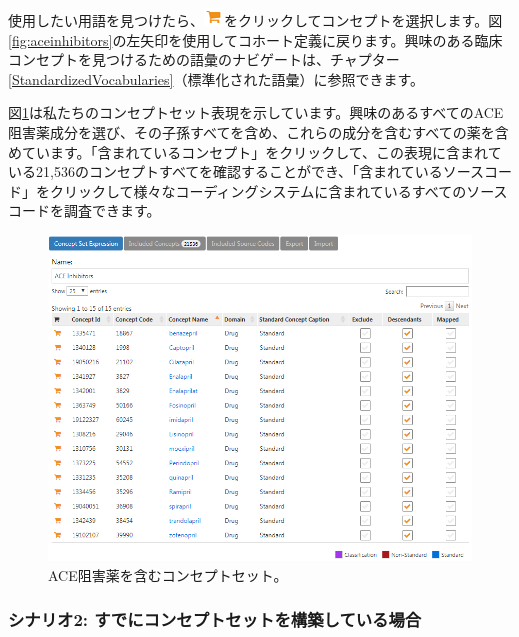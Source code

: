 \documentclass[
  11pt]{book}
\theoremstyle{definition}
\theoremstyle{definition}
\theoremstyle{definition}
\theoremstyle{definition}
\theoremstyle{remark}
\begin{document}
使用したい用語を見つけたら、\includegraphics{images/Cohorts/shoppingcart.png}をクリックしてコンセプトを選択します。図\ref{fig:aceinhibitors}の左矢印を使用してコホート定義に戻ります。興味のある臨床コンセプトを見つけるための語彙のナビゲートは、チャプター\ref{StandardizedVocabularies}（標準化された語彙）に参照できます。

図\ref{fig:aceConceptSetExpression}は私たちのコンセプトセット表現を示しています。興味のあるすべてのACE阻害薬成分を選び、その子孫すべてを含め、これらの成分を含むすべての薬を含めています。「含まれているコンセプト」をクリックして、この表現に含まれている21,536のコンセプトすべてを確認することができ、「含まれているソースコード」をクリックして様々なコーディングシステムに含まれているすべてのソースコードを調査できます。

\begin{figure}

{\centering \includegraphics[width=1\linewidth]{images/Cohorts/aceConceptSetExpression} 

}

\caption{ACE阻害薬を含むコンセプトセット。}\label{fig:aceConceptSetExpression}
\end{figure}

\subsubsection*{シナリオ2: すでにコンセプトセットを構築している場合}\label{ux30b7ux30caux30eaux30aa2-ux3059ux3067ux306bux30b3ux30f3ux30bbux30d7ux30c8ux30bbux30c3ux30c8ux3092ux69cbux7bc9ux3057ux3066ux3044ux308bux5834ux5408}
\end{document}
